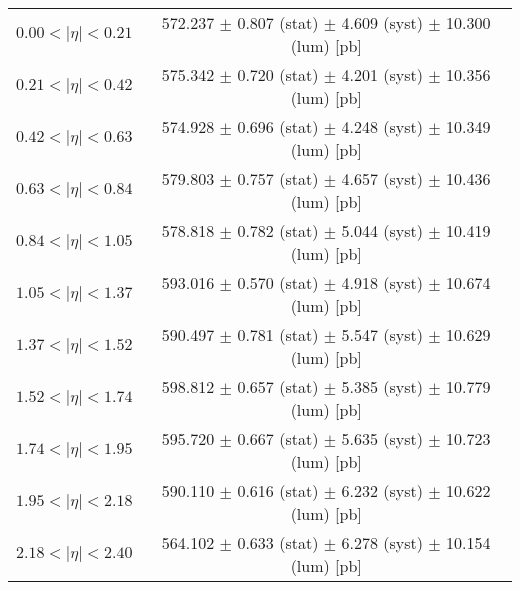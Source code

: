 \begin{tabular}{lc}
\hline
$0.00 < |\eta| <0.21$          & 572.237 $\pm$ 0.807 (stat) $\pm$ 4.609 (syst) $\pm$ 10.300 (lum) [pb]  \\
$0.21 < |\eta| <0.42$          & 575.342 $\pm$ 0.720 (stat) $\pm$ 4.201 (syst) $\pm$ 10.356 (lum) [pb]  \\
$0.42 < |\eta| <0.63$          & 574.928 $\pm$ 0.696 (stat) $\pm$ 4.248 (syst) $\pm$ 10.349 (lum) [pb]  \\
$0.63 < |\eta| <0.84$          & 579.803 $\pm$ 0.757 (stat) $\pm$ 4.657 (syst) $\pm$ 10.436 (lum) [pb]  \\
$0.84 < |\eta| <1.05$          & 578.818 $\pm$ 0.782 (stat) $\pm$ 5.044 (syst) $\pm$ 10.419 (lum) [pb]  \\
$1.05 < |\eta| <1.37$          & 593.016 $\pm$ 0.570 (stat) $\pm$ 4.918 (syst) $\pm$ 10.674 (lum) [pb]  \\
$1.37 < |\eta| <1.52$          & 590.497 $\pm$ 0.781 (stat) $\pm$ 5.547 (syst) $\pm$ 10.629 (lum) [pb]  \\
$1.52 < |\eta| <1.74$          & 598.812 $\pm$ 0.657 (stat) $\pm$ 5.385 (syst) $\pm$ 10.779 (lum) [pb]  \\
$1.74 < |\eta| <1.95$          & 595.720 $\pm$ 0.667 (stat) $\pm$ 5.635 (syst) $\pm$ 10.723 (lum) [pb]  \\
$1.95 < |\eta| <2.18$          & 590.110 $\pm$ 0.616 (stat) $\pm$ 6.232 (syst) $\pm$ 10.622 (lum) [pb]  \\
$2.18 < |\eta| <2.40$          & 564.102 $\pm$ 0.633 (stat) $\pm$ 6.278 (syst) $\pm$ 10.154 (lum) [pb]  \\
\hline
\end{tabular}
